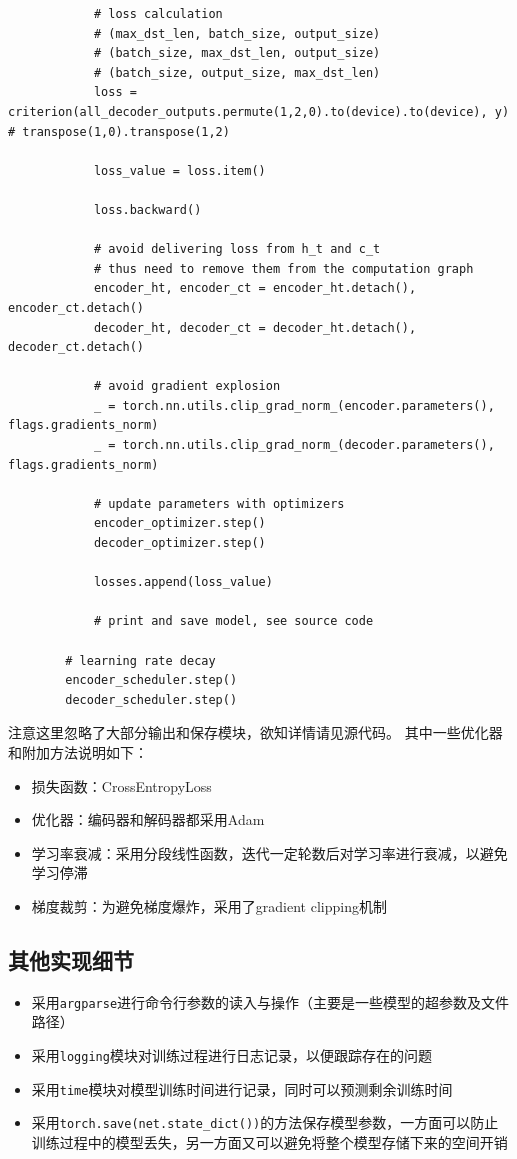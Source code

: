 \documentclass[logo,reportComp]{thesis}
\begin{document}
\begin{lstlisting}
            # loss calculation
            # (max_dst_len, batch_size, output_size)
            # (batch_size, max_dst_len, output_size)
            # (batch_size, output_size, max_dst_len)
            loss = criterion(all_decoder_outputs.permute(1,2,0).to(device).to(device), y) # transpose(1,0).transpose(1,2)

            loss_value = loss.item()

            loss.backward()

            # avoid delivering loss from h_t and c_t
            # thus need to remove them from the computation graph
            encoder_ht, encoder_ct = encoder_ht.detach(), encoder_ct.detach()
            decoder_ht, decoder_ct = decoder_ht.detach(), decoder_ct.detach()

            # avoid gradient explosion
            _ = torch.nn.utils.clip_grad_norm_(encoder.parameters(), flags.gradients_norm)
            _ = torch.nn.utils.clip_grad_norm_(decoder.parameters(), flags.gradients_norm)

            # update parameters with optimizers
            encoder_optimizer.step()
            decoder_optimizer.step()

            losses.append(loss_value)

            # print and save model, see source code

        # learning rate decay
        encoder_scheduler.step()
        decoder_scheduler.step()
\end{lstlisting}

注意这里忽略了大部分输出和保存模块，欲知详情请见源代码。
其中一些优化器和附加方法说明如下：
\begin{itemize}
    \item 损失函数：CrossEntropyLoss
    \item 优化器：编码器和解码器都采用Adam
    \item 学习率衰减：采用分段线性函数，迭代一定轮数后对学习率进行衰减，以避免学习停滞
    \item 梯度裁剪：为避免梯度爆炸，采用了gradient clipping机制
\end{itemize}

\subsection{其他实现细节}
\begin{itemize}
    \item 采用\verb'argparse'进行命令行参数的读入与操作（主要是一些模型的超参数及文件路径）
    \item 采用\verb'logging'模块对训练过程进行日志记录，以便跟踪存在的问题
    \item 采用\verb'time'模块对模型训练时间进行记录，同时可以预测剩余训练时间
    \item 采用\verb'torch.save(net.state_dict())'的方法保存模型参数，一方面可以防止训练过程中的模型丢失，另一方面又可以避免将整个模型存储下来的空间开销
\end{itemize}
\end{document}
